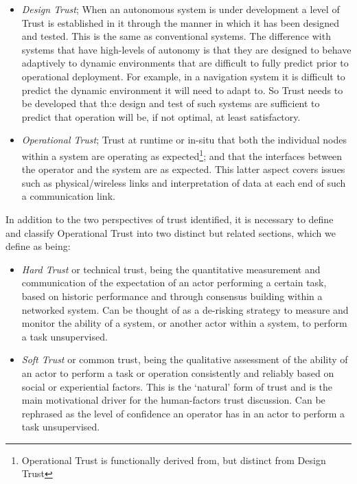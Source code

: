 \begin{itemize}
  \item \emph{Design Trust}; When an autonomous system is under development a level of Trust is established in it through the manner in which it has been designed and tested.
    This is the same as conventional systems.
    The difference with systems that have high-levels of autonomy is that they are designed to behave adaptively to dynamic environments that are difficult to fully predict prior to operational deployment.
    For example, in a navigation system it is difficult to predict the dynamic environment it will need to adapt to.
    So Trust needs to be developed that th:e design and test of such systems are sufficient to predict that operation will be, if not optimal, at least satisfactory.

  \item \emph{Operational Trust}; Trust at runtime or in-situ that both the individual nodes within a system are operating as expected\footnote{Operational Trust is functionally derived from, but distinct from Design Trust}; and that the interfaces between the operator and the system are as expected.
    This latter aspect covers issues such as physical/wireless links and interpretation of data at each end of such a communication link.
\end{itemize}

In addition to the two perspectives of trust identified, it is necessary to define and classify Operational Trust into two distinct but related sections, which we define as being:
\begin{itemize}
  \item \emph{Hard Trust} or technical trust, being the quantitative measurement and communication of the expectation of an actor performing a certain task, based on historic performance and through consensus building within a networked system.
    Can be thought of as a de-risking strategy to measure and monitor the ability of a system, or another actor within a system, to perform a task unsupervised.
  \item \emph{Soft Trust} or common trust, being the qualitative assessment of the ability of an actor to perform a task or operation consistently and reliably based on social or experiential factors.
    This is the ‘natural’ form of trust and is the main motivational driver for the human-factors trust discussion.
    Can be rephrased as the level of confidence an operator has in an actor to perform a task unsupervised.
\end{itemize} 

